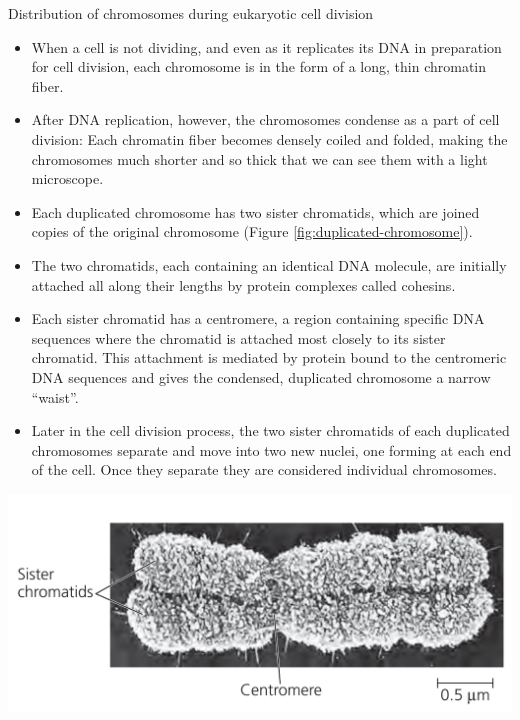 \documentclass[11pt,dvipsnames,ignorenonframetext,aspectratio=169]{beamer}
\providecommand{\tightlist}{%
  \setlength{\itemsep}{0pt}\setlength{\parskip}{0pt}}
\begin{document}
\begin{frame}{Distribution of chromosomes during eukaryotic cell
division}
\protect\hypertarget{distribution-of-chromosomes-during-eukaryotic-cell-division}{}

\begin{itemize}
\tightlist
\item
  When a cell is not dividing, and even as it replicates its DNA in
  preparation for cell division, each chromosome is in the form of a
  long, thin chromatin fiber.
\item
  After DNA replication, however, the chromosomes condense as a part of
  cell division: Each chromatin fiber becomes densely coiled and folded,
  making the chromosomes much shorter and so thick that we can see them
  with a light microscope.
\item
  Each duplicated chromosome has two sister chromatids, which are joined
  copies of the original chromosome (Figure
  \ref{fig:duplicated-chromosome}).
\item
  The two chromatids, each containing an identical DNA molecule, are
  initially attached all along their lengths by protein complexes called
  cohesins.
\end{itemize}

\end{frame}

\begin{frame}{}
\protect\hypertarget{section-6}{}

\begin{itemize}
\tightlist
\item
  Each sister chromatid has a centromere, a region containing specific
  DNA sequences where the chromatid is attached most closely to its
  sister chromatid. This attachment is mediated by protein bound to the
  centromeric DNA sequences and gives the condensed, duplicated
  chromosome a narrow ``waist''.
\item
  Later in the cell division process, the two sister chromatids of each
  duplicated chromosomes separate and move into two new nuclei, one
  forming at each end of the cell. Once they separate they are
  considered individual chromosomes.
\end{itemize}

\end{frame}

\begin{frame}{}
\protect\hypertarget{section-7}{}

\begin{center}\includegraphics[width=0.8\linewidth]{../images/duplicated_chromosomes_hd} \end{center}

\end{frame}
\end{document}
